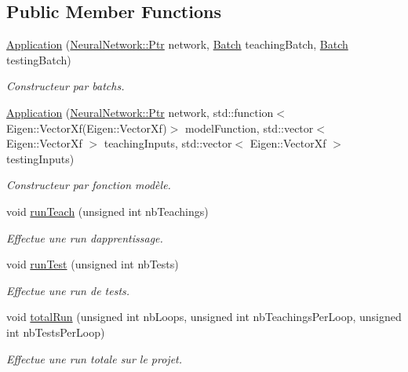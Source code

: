\subsection*{Public Member Functions}
\begin{DoxyCompactItemize}
\item 
\hyperlink{classApplication_ab46d83da0e069b75ab971725bcf24a54}{Application} (\hyperlink{classNeuralNetwork_a31de381df65f261fd0f38e0559995d1a}{Neural\+Network\+::\+Ptr} network, \hyperlink{classApplication_a9888f02149ca3b8ffa499ee07426cd1d}{Batch} teaching\+Batch, \hyperlink{classApplication_a9888f02149ca3b8ffa499ee07426cd1d}{Batch} testing\+Batch)
\begin{DoxyCompactList}\small\item\em Constructeur par batchs. \end{DoxyCompactList}\item 
\hyperlink{classApplication_a662325bca303994250427110d5d771e7}{Application} (\hyperlink{classNeuralNetwork_a31de381df65f261fd0f38e0559995d1a}{Neural\+Network\+::\+Ptr} network, std\+::function$<$ Eigen\+::\+Vector\+Xf(Eigen\+::\+Vector\+Xf)$>$ model\+Function, std\+::vector$<$ Eigen\+::\+Vector\+Xf $>$ teaching\+Inputs, std\+::vector$<$ Eigen\+::\+Vector\+Xf $>$ testing\+Inputs)
\begin{DoxyCompactList}\small\item\em Constructeur par fonction modèle. \end{DoxyCompactList}\item 
void \hyperlink{classApplication_ae93c9eb1888c7b3bbab68aa5da50ce46}{run\+Teach} (unsigned int nb\+Teachings)
\begin{DoxyCompactList}\small\item\em Effectue une run d\textquotesingle{}apprentissage. \end{DoxyCompactList}\item 
void \hyperlink{classApplication_a2efd3cc253a127ea682a00b560f6d073}{run\+Test} (unsigned int nb\+Tests)
\begin{DoxyCompactList}\small\item\em Effectue une run de tests. \end{DoxyCompactList}\item 
void \hyperlink{classApplication_a105d173f14e444ddb485d5ac5df91d74}{total\+Run} (unsigned int nb\+Loops, unsigned int nb\+Teachings\+Per\+Loop, unsigned int nb\+Tests\+Per\+Loop)
\begin{DoxyCompactList}\small\item\em Effectue une run totale sur le projet. \end{DoxyCompactList}\end{DoxyCompactItemize}
